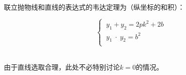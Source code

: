 \documentclass[UTF8]{ctexart}
\begin{document}
    联立抛物线和直线的表达式的韦达定理为（纵坐标的和积）：\vspace{3pt}
    \begin{large}
        \begin{equation*}
            ~~~~~~\begin{cases}
                ~y_1+y_2=2pk^2+2b\\[1mm]
                ~y_1\hspace{3pt}\cdot\hspace{3pt}y_2=b^2\\[1mm]
            \end{cases}
        \end{equation*}
    \end{large}\\[1mm]
    由于直线选取合理，此处不必特别讨论$k=0$的情况。

\newpage
\end{document}
